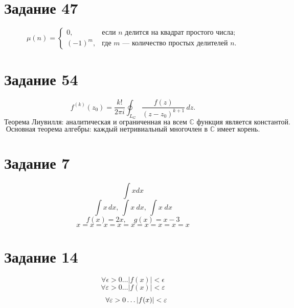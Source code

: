 \documentclass[a4paper,12pt]{article}
\begin{document}
\section*{Задание 47}
\[
\mu(n)=
\begin{cases}
0, & \text{если $n$ делится на квадрат простого числа};\\
(-1)^m, & \text{где $m$ — количество простых делителей $n$}.
\end{cases}
\]

\section*{Задание 54}
\[
 f^{(k)}(z_0)=\frac{k!}{2\pi i}\oint_{L_G}\frac{f(z)}{(z-z_0)^{k+1}}\,dz.
\]
\[
\text{Теорема Лиувилля: аналитическая и ограниченная на всем }\mathbb{C}\text{ функция является константой.}
\]
\[
\text{Основная теорема алгебры: каждый нетривиальный многочлен в }\mathbb{C}\text{ имеет корень.}
\]

\section*{Задание 7}
\[
\int xdx
\]
\[
\int x\,dx,\ \int x\:dx,\ \int x\;dx
\]
\[
 f(x)=2x,\quad g(x)=x-3
\]
\[
 x=x=x=x=x=x=x=x=x
\]

\section*{Задание 14}
\[
\forall \epsilon>0\dots |f(x)|<\epsilon
\]
\[
\forall \varepsilon>0\dots |f(x)|<\varepsilon
\]
\[
\let\epsilon\varepsilon\quad \forall \epsilon>0\dots |f(x)|<\epsilon
\]
\end{document}
